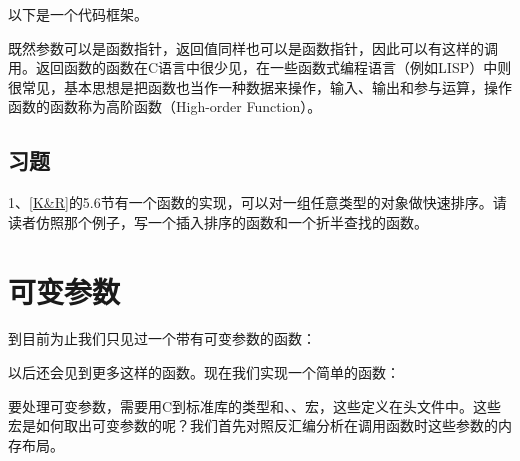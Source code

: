 以下是一个代码框架。





既然参数可以是函数指针，返回值同样也可以是函数指针，因此可以有这样的调用。返回函数的函数在C语言中很少见，在一些函数式编程语言（例如LISP）中则很常见，基本思想是把函数也当作一种数据来操作，输入、输出和参与运算，操作函数的函数称为高阶函数（High-order Function）。


\subsection*{习题}
%


1、\hyperlink{db.bi01.bibli.kr}{[K\&R]}的5.\BookSplit{}6节有一个函数的实现，可以对一组任意类型的对象做快速排序。请读者仿照那个例子，写一个插入排序的函数和一个折半查找的函数。




\section{可变参数}
%
到目前为止我们只见过一个带有可变参数的函数：




以后还会见到更多这样的函数。现在我们实现一个简单的函数：





要处理可变参数，需要用C到标准库的类型和、、宏，这些定义在头文件中。这些宏是如何取出可变参数的呢？我们首先对照反汇编分析在调用函数时这些参数的内存布局。


